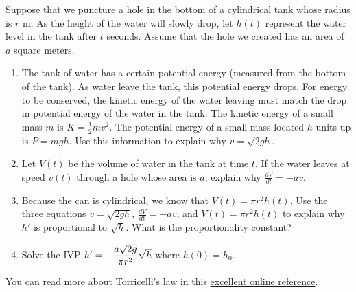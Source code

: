 \begin{problem}
Suppose that we puncture a hole in the bottom of a cylindrical tank whose radius is $r$ m. As the height of the water will slowly drop, let $h(t)$ represent the water level in the tank after $t$ seconds. Assume that the hole we created has an area of $a$ square meters. 
\begin{enumerate}
 \item The tank of water has a certain potential energy (measured from the bottom of the tank). As water leave the tank, this potential energy drops.  For energy to be conserved, the kinetic energy of the water leaving must match the drop in potential energy of the water in the tank. The kinetic energy of a small mass $m$ is $K = \frac{1}{2}mv^2$.  The potential energy of a small mass located $h$ units up is $P=mgh$. Use this information to explain why $v=\sqrt{2gh}$. 
 \item Let $V(t)$ be the volume of water in the tank at time $t$. If the water leaves at speed $v(t)$ through a hole whose area is $a$, explain why $\frac{dV}{dt} = -av$.
 \item  Because the can is cylindrical, we know that $V(t) = \pi r^2 h(t)$. Use the three equations $v=\sqrt{2gh}$, $\frac{dV}{dt} = -av$, and $V(t) = \pi r^2 h(t)$ to explain why $h'$ is proportional to $\sqrt{h}$. What is the proportionality constant?
 \item Solve the IVP $h' = \displaystyle-\frac{a\sqrt{2g}}{\pi r^2}\sqrt{h}$ where $h(0)=h_0$. 
\end{enumerate}
You can read more about Torricelli's law in this 
\href{http://books.google.com/books?id=s1-mZMg5fLgC&pg=PA176&lpg=PA176&dq=torricelli's+law+differential+equation+examples&source=bl&ots=03odLvcYgt&sig=3_fAXBnd0zeqd2ynFVBgw2JOI9Y&hl=en&sa=X&ei=zg6FUeWROc7migKjgoGQDQ&sqi=2&ved=0CEUQ6AEwAw#v=onepage&q=torricelli's\%20law\%20differential\%20equation\%20examples&f=false}{excellent online reference}.
\end{problem}

